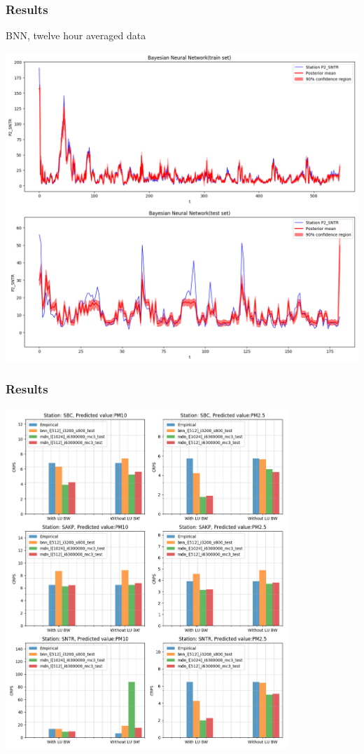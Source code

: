 \documentclass[18pt]{beamer}
\begin{document}
\begin{frame}
  \frametitle{Results}
  
  BNN, twelve hour averaged data
  \begin{center}
    \includegraphics[scale=0.25]{images/12h/bnn_12h}
  \end{center}
  
\end{frame}


\begin{frame}
  \frametitle{Results}
  \begin{center}
    \vspace*{-0.2in}
    \includegraphics[height=0.65\textwidth, width=0.8\textwidth ]{images/1h/results_plot_CRPS}
  \end{center}
\end{frame}
\end{document}
